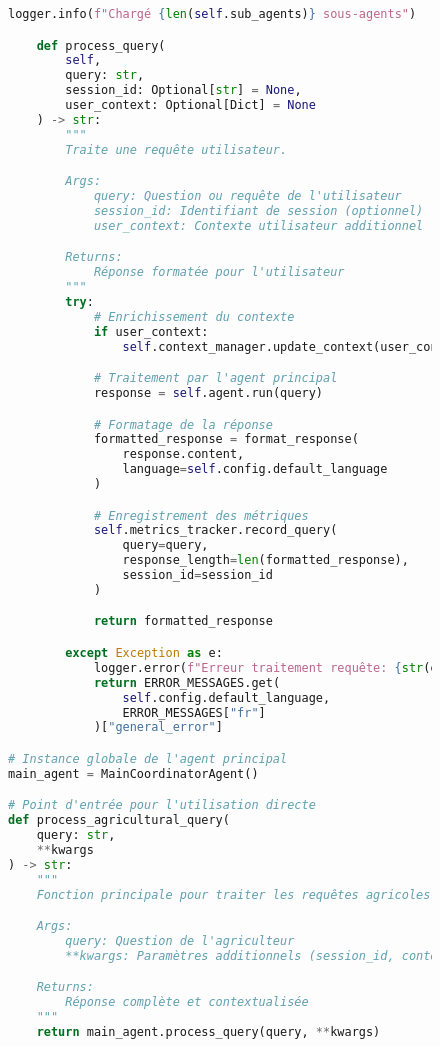\begin{figure}[H]
\begin{lstlisting}[language=Python, caption=Structure complète de l'agent principal]
        logger.info(f"Chargé {len(self.sub_agents)} sous-agents")

    def process_query(
        self,
        query: str,
        session_id: Optional[str] = None,
        user_context: Optional[Dict] = None
    ) -> str:
        """
        Traite une requête utilisateur.

        Args:
            query: Question ou requête de l'utilisateur
            session_id: Identifiant de session (optionnel)
            user_context: Contexte utilisateur additionnel

        Returns:
            Réponse formatée pour l'utilisateur
        """
        try:
            # Enrichissement du contexte
            if user_context:
                self.context_manager.update_context(user_context)

            # Traitement par l'agent principal
            response = self.agent.run(query)

            # Formatage de la réponse
            formatted_response = format_response(
                response.content,
                language=self.config.default_language
            )

            # Enregistrement des métriques
            self.metrics_tracker.record_query(
                query=query,
                response_length=len(formatted_response),
                session_id=session_id
            )

            return formatted_response

        except Exception as e:
            logger.error(f"Erreur traitement requête: {str(e)}")
            return ERROR_MESSAGES.get(
                self.config.default_language,
                ERROR_MESSAGES["fr"]
            )["general_error"]

# Instance globale de l'agent principal
main_agent = MainCoordinatorAgent()

# Point d'entrée pour l'utilisation directe
def process_agricultural_query(
    query: str,
    **kwargs
) -> str:
    """
    Fonction principale pour traiter les requêtes agricoles.

    Args:
        query: Question de l'agriculteur
        **kwargs: Paramètres additionnels (session_id, context, etc.)

    Returns:
        Réponse complète et contextualisée
    """
    return main_agent.process_query(query, **kwargs)
\end{lstlisting}
\end{figure}

